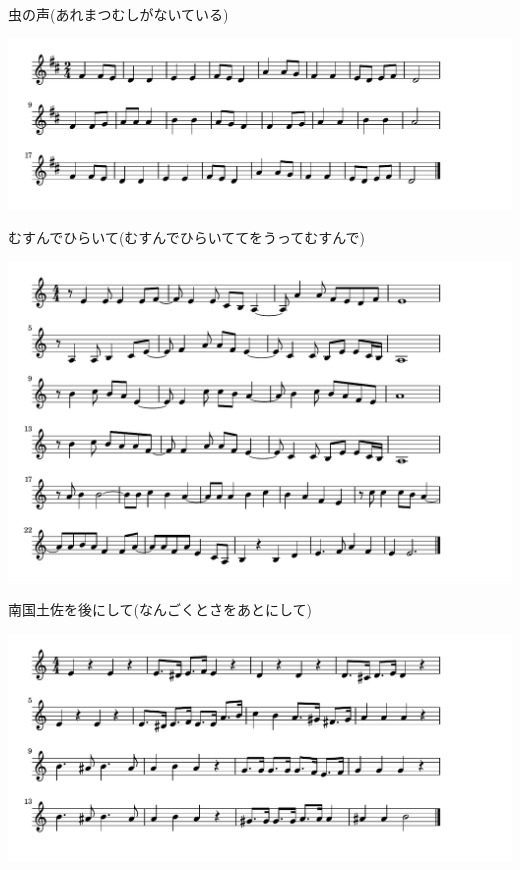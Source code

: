\documentclass[a4paper]{ltjsarticle}
\begin{document}
\vspace{-10mm} \hspace{10mm}
虫の声(あれまつむしがないている)



\includegraphics[clip]{musunde_crop.pdf}

\vspace{-10mm} \hspace{10mm}
むすんでひらいて(むすんでひらいててをうってむすんで)



\includegraphics[clip]{nangoku_crop.pdf}

\vspace{-10mm} \hspace{10mm}
南国土佐を後にして(なんごくとさをあとにして)





\includegraphics[clip]{onetwojenkka_crop.pdf}
\end{document}

